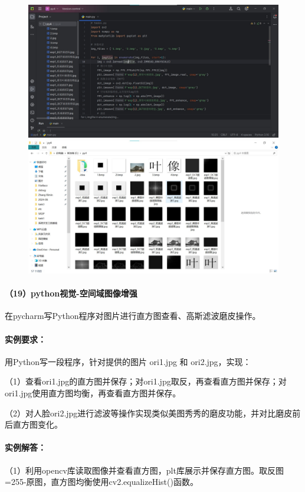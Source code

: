 \documentclass[a4paper, 12pt]{article}
\begin{document}
	\begin{figure}[H]
		\centering
		\includegraphics[width=1\textwidth]{035.jpg}
		\includegraphics[width=1\textwidth]{036.jpg}
	\end{figure}
	
	\paragraph{（19）python视觉-空间域图像增强}
	在pycharm写Python程序对图片进行直方图查看、高斯滤波磨皮操作。
	
	\paragraph{实例要求：}
	用Python写一段程序，针对提供的图片 ori1.jpg 和 ori2.jpg，实现：
	
	（1）查看ori1.jpg的直方图并保存；对ori1.jpg取反，再查看直方图并保存；对ori1.jpg使用直方图均衡，再查看直方图并保存。
	
	（2）对人脸ori2.jpg进行滤波等操作实现类似美图秀秀的磨皮功能，并对比磨皮前后直方图变化。
	
	\paragraph{实例解答：}
	（1）利用opencv库读取图像并查看直方图，plt库展示并保存直方图。取反图=255-原图，直方图均衡使用cv2.equalizeHist()函数。
	
\end{document}

